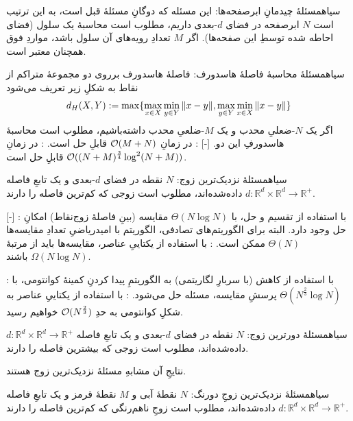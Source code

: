 ‌سیاه{مسئلهٔ چیدمانِ ابرصفحه‌ها}: این مسئله که دوگانِ مسئلهٔ قبل است، به این ترتیب است $N$ ابرصفحه در فضای $d$-بعدی داریم، مطلوب است محاسبهٔ یک سلول (فضای احاطه شده توسطِ این صفحه‌ها).
اگر $M$ تعدادِ رویه‌های آن سلول باشد، مواردِ فوق همچنان معتبر است.

‌سیاه{مسئلهٔ محاسبهٔ فاصلهٔ هاسدورف:} فاصلهٔ هاسدورف برروی دو مجموعهٔ متراکم از نقاط به شکلِ زیر تعریف می‌شود
\begin{equation}
    d_H(X, Y) := \max \{ \max_{x \in X} \min_{y \in Y} \norm{x - y}, \max_{y \in Y} \min_{x \in X} \norm{x - y} \}
\end{equation}
اگر یک $N$-ضعلیِ محدب و یک $M$-ضلعیِ محدب داشته‌باشیم، مطلوب است محاسبهٔ هاسدورفِ این دو.  
[-]
    : در زمانِ 
    $\mathcal{O}(M + N)$
    قابلِ حل است.
    : در زمانِ
    $\mathcal{O}((N+M)^{\frac{3}{4}} \log^2 (N+M))$
    قابلِ حل است.

‌سیاه{مسئلهٔ نزدیک‌ترین زوج}: 
\(N\)
نقطه در فضای \(d\)-بعدی و یک تابعِ فاصله 
\(d: \mathbb{R}^d \times \mathbb{R}^d \to \mathbb{R}^+\)
داده‌شده‌اند، مطلوب است زوجی که کم‌ترین فاصله را دارند. 

[-]
    : با استفاده از تقسیم و حل، با 
    $\Theta(N \log N)$ 
    مقایسه (بینِ فاصلهٔ زوج‌نقاط)
    امکانِ حل وجود دارد.
    البته برای الگوریتم‌های تصادفی، الگوریتم با امیدریاضیِ تعدادِ مقایسه‌ها
    $\Theta(N)$
    ممکن است.
    : با استفاده از یکتاییِ عناصر، مقایسه‌ها باید از مرتبهٔ
    $\Omega(N \log N)$
    باشند.

    : با استفاده از کاهش (با سربارِ لگاریتمی) به الگوریتمِ پیدا کردنِ کمینهٔ کوانتومی، با
    $\Theta(N^{\frac{2}{3}} \log N)$
    پرسشِ مقایسه، مسئله حل می‌شود.
    : با استفاده از یکتاییِ عناصر به شکلِ کوانتومی به حدِ
    $\mathcal{O}(N^{\frac{2}{3}})$
    خواهیم رسید.

‌سیاه{مسئلهٔ دورترین زوج}: 
\(N\)
نقطه در فضای \(d\)-بعدی و یک تابعِ فاصله 
\(d: \mathbb{R}^d \times \mathbb{R}^d \to \mathbb{R}^+\)
داده‌شده‌اند، مطلوب است زوجی که بیشترین فاصله را دارند.
 
نتایجِ آن مشابهِ مسئلهٔ نزدیک‌ترین زوج هستند.

‌سیاه{مسئلهٔ نزدیک‌ترین زوجِ دورنگ}: 
$N$
نقطهٔ آبی و $M$ نقطهٔ قرمز و یک تابعِ فاصله 
\(d: \mathbb{R}^d \times \mathbb{R}^d \to \mathbb{R}^+\)
داده‌شده‌اند، مطلوب است زوجِ ناهم‌رنگی که کم‌ترین فاصله را دارند. \cite[]{kao}

